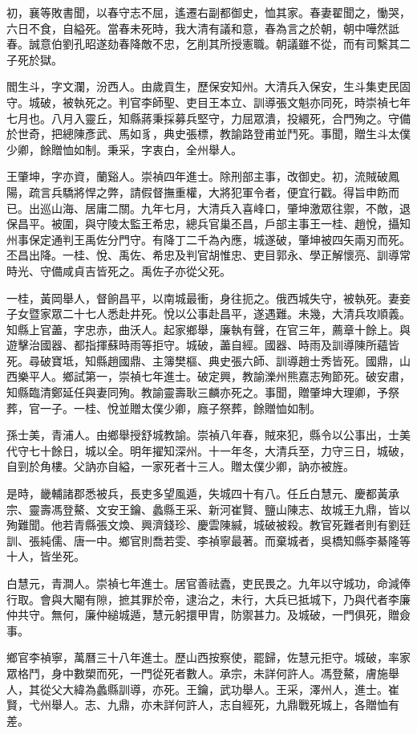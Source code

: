 \begin{pinyinscope}
初，襄等敗書聞，以春守志不屈，遙遷右副都御史，恤其家。春妻翟聞之，慟哭，六日不食，自縊死。當春未死時，我大清有議和意，春為言之於朝，朝中嘩然詆春。誠意伯劉孔昭遂劾春降敵不忠，乞削其所授憲職。朝議雖不從，而有司繫其二子死於獄。

閻生斗，字文瀾，汾西人。由歲貢生，歷保安知州。大清兵入保安，生斗集吏民固守。城破，被執死之。判官李師聖、吏目王本立、訓導張文魁亦同死，時崇禎七年七月也。八月入靈丘，知縣蔣秉採募兵堅守，力屈眾潰，投繯死，合門殉之。守備於世奇，把總陳彥武、馬如豸，典史張標，教諭路登甫並鬥死。事聞，贈生斗太僕少卿，餘贈恤如制。秉采，字衷白，全州舉人。

王肇坤，字亦資，蘭谿人。崇禎四年進士。除刑部主事，改御史。初，流賊破鳳陽，疏言兵驕將悍之弊，請假督撫重權，大將犯軍令者，便宜行戳。得旨申飭而已。出巡山海、居庸二關。九年七月，大清兵入喜峰口，肇坤激眾往禦，不敵，退保昌平。被圍，與守陵太監王希忠，總兵官巢丕昌，戶部主事王一桂、趙悅，攝知州事保定通判王禹佐分門守。有降丁二千為內應，城遂破，肇坤被四矢兩刃而死。丕昌出降。一桂、悅、禹佐、希忠及判官胡惟忠、吏目郭永、學正解懷亮、訓導常時光、守備咸貞吉皆死之。禹佐子亦從父死。

一桂，黃岡舉人，督餉昌平，以南城最衝，身往扼之。俄西城失守，被執死。妻妾子女暨家眾二十七人悉赴井死。悅以公事赴昌平，遂遇難。未幾，大清兵攻順義。知縣上官藎，字忠赤，曲沃人。起家鄉舉，廉執有聲，在官三年，薦章十餘上。與遊擊治國器、都指揮蘇時雨等拒守。城破，藎自經。國器、時雨及訓導陳所蘊皆死。尋破寶坻，知縣趙國鼎、主簿樊樞、典史張六師、訓導趙士秀皆死。國鼎，山西樂平人。鄉試第一，崇禎七年進士。破定興，教諭濼州熊嘉志殉節死。破安肅，知縣臨清鄭延任與妻同殉。教諭靈壽耿三麟亦死之。事聞，贈肇坤大理卿，予祭葬，官一子。一桂、悅並贈太僕少卿，廕子祭葬，餘贈恤如制。

孫士美，青浦人。由鄉舉授舒城教諭。崇禎八年春，賊來犯，縣令以公事出，士美代守七十餘日，城以全。明年擢知深州。十一年冬，大清兵至，力守三日，城破，自剄於角樓。父訥亦自縊，一家死者十三人。贈太僕少卿，訥亦被旌。

是時，畿輔諸郡悉被兵，長吏多望風遁，失城四十有八。任丘白慧元、慶都黃承宗、靈壽馮登鰲、文安王鑰、蠡縣王采、新河崔賢、鹽山陳志、故城王九鼎，皆以殉難聞。他若青縣張文煥、興濟錢珍、慶雲陳緘，城破被殺。教官死難者則有劉廷訓、張純儒、唐一中。鄉官則喬若雯、李禎寧最著。而棄城者，吳橋知縣李綦隆等十人，皆坐死。

白慧元，青澗人。崇禎七年進士。居官善祛蠹，吏民畏之。九年以守城功，命減俸行取。會與大閹有隙，摭其罪於帝，逮治之，未行，大兵已抵城下，乃與代者李廉仲共守。無何，廉仲縋城遁，慧元躬擐甲胄，防禦甚力。及城破，一門俱死，贈僉事。

鄉官李禎寧，萬曆三十八年進士。歷山西按察使，罷歸，佐慧元拒守。城破，率家眾格鬥，身中數槊而死，一門從死者數人。承宗，未詳何許人。馮登鰲，膚施舉人，其從父大緯為蠡縣訓導，亦死。王鑰，武功舉人。王采，澤州人，進士。崔賢，弋州舉人。志、九鼎，亦未詳何許人，志自經死，九鼎戰死城上，各贈恤有差。


\end{pinyinscope}
